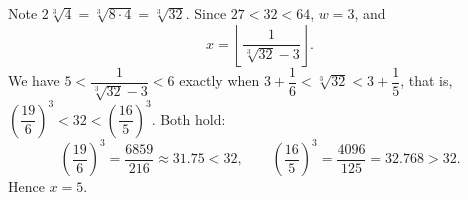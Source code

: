 Note $2\sqrt[3]4=\sqrt[3]{8\cdot4}=\sqrt[3]{32}$. Since $27<32<64$, $w=3$, and
\[
x=\left\lfloor\dfrac{1}{\sqrt[3]{32}-3}\right\rfloor .
\]
We have $5<\dfrac{1}{\sqrt[3]{32}-3}<6$ exactly when $3+\dfrac{1}{6}<\sqrt[3]{32}<3+\dfrac{1}{5}$, that is, $\left(\dfrac{19}{6}\right)^3<32<\left(\dfrac{16}{5}\right)^3$. Both hold:
\[
\left(\dfrac{19}{6}\right)^3=\dfrac{6859}{216}\approx31.75<32,\qquad \left(\dfrac{16}{5}\right)^3=\dfrac{4096}{125}=32.768>32 .
\]
Hence $x=\boxed{5}$.

